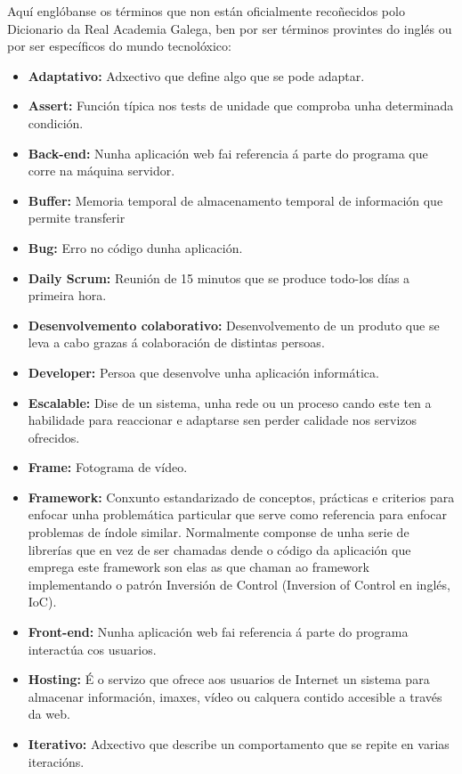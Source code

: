     Aquí englóbanse os términos que non están oficialmente recoñecidos polo Dicionario da Real 
    Academia Galega, ben por ser términos provintes do inglés ou por ser específicos do mundo tecnolóxico:
\begin{itemize}
    \item \textbf{Adaptativo:} Adxectivo que define algo que se pode adaptar.
    \item \textbf{Assert:} Función típica nos tests de unidade que comproba unha determinada condición. 
    \item \textbf{Back-end:} Nunha aplicación web fai referencia á parte do programa que corre na máquina 
    servidor.
    \item \textbf{Buffer:} Memoria temporal de almacenamento temporal de información que permite transferir
    \item \textbf{Bug:} Erro no código dunha aplicación.
    \item \textbf{Daily Scrum:} Reunión de 15 minutos que se produce todo-los días a primeira hora.
    \item \textbf{Desenvolvemento colaborativo:} Desenvolvemento de un produto que se leva a cabo grazas á 
        colaboración de distintas persoas.
    \item \textbf{Developer:} Persoa que desenvolve unha aplicación informática.
    \item \textbf{Escalable:} Dise de un sistema, unha rede ou un proceso cando este ten a habilidade para
        reaccionar e adaptarse sen perder calidade nos servizos ofrecidos.
    \item \textbf{Frame:} Fotograma de vídeo.
    \item \textbf{Framework:} Conxunto estandarizado de conceptos, prácticas e criterios para enfocar unha
        problemática particular que serve como referencia para enfocar problemas de índole similar. 
        Normalmente componse de unha serie de librerías que en vez de ser chamadas dende o código da 
        aplicación que emprega este framework son elas as que chaman ao framework implementando o 
        patrón Inversión de Control (Inversion of Control en inglés, IoC).
    \item \textbf{Front-end:} Nunha aplicación web fai referencia á parte do programa interactúa cos usuarios.
    \item \textbf{Hosting:} É o servizo que ofrece aos usuarios de Internet un sistema para almacenar 
        información, imaxes, vídeo ou calquera contido accesible a través da web.    
    \item \textbf{Iterativo:} Adxectivo que describe un comportamento que se repite en varias iteracións. 

\end{itemize}
